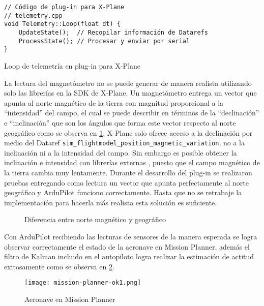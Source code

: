 \begin{listing}[h]
    \begin{verbatim}
// Código de plug-in para X-Plane
// telemetry.cpp
void Telemetry::Loop(float dt) {
    UpdateState();  // Recopilar información de Datarefs
    ProcessState(); // Procesar y enviar por serial
}
    \end{verbatim}
    \caption{Loop de telemetría en plug-in para X-Plane}
    \label{lst:telemetry-loop}
\end{listing}

La lectura del magnetómetro no se puede generar de manera realista utilizando solo las librerías en la SDK de X-Plane. Un magnetómetro entrega un vector que apunta al norte magnético de la tierra con magnitud proporcional a la ``intensidad'' del campo, el cual se puede describir en términos de la ``declinación'' e ``inclinación'' que son los ángulos que forma este vector respecto al norte geográfico como se observa en \cref{fig:magnetic-geographic-north}. X-Plane solo ofrece acceso a la declinación por medio del Dataref \texttt{sim\_flightmodel\_position\_magnetic\_variation}, no a la inclinación ni a la intensidad del campo. Sin embargo es posible obtener la inclinación e intensidad con librerías externas \cite{geomag}, puesto que el campo magnético de la tierra cambia muy lentamente. Durante el desarrollo del plug-in se realizaron pruebas entregando como lectura un vector que apunta perfectamente al norte geográfico y ArduPilot funciono correctamente. Hasta que no se retrabaje la implementación para hacerla más realista esta solución es suficiente.

\begin{figure}[h]
    \centering
    
    \caption{Diferencia entre norte magnético y geográfico}
    \label{fig:magnetic-geographic-north}
\end{figure}

Con ArduPilot recibiendo las lecturas de sensores de la manera esperada se logra observar correctamente el estado de la aeronave en Mission Planner, además el filtro de Kalman incluido en el autopiloto logra realizar la estimación de actitud exitosamente como se observa en \cref{fig:mission-planner-ok1}.

\begin{figure}[h]
    \centering
    \texttt{[image: mission-planner-ok1.png]}
    \caption{Aeronave en Mission Planner}
    \label{fig:mission-planner-ok1}
\end{figure}

